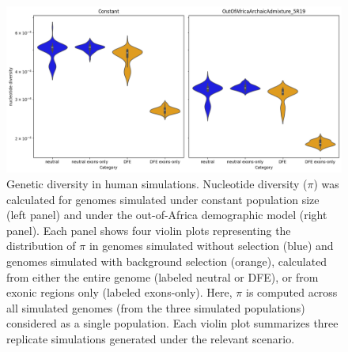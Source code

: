 \documentclass[hidelinks]{article}
\begin{document}
\begin{figure}[h]
    \centering
    \includegraphics[width=\textwidth]{figures/HomSap/summary_stats.png}
    \caption{
    \label{fig:homsap-summary-stats}
    Genetic diversity in human simulations.
    Nucleotide diversity ($\pi$) was calculated for genomes simulated
    under constant population size (left panel) and under the out-of-Africa demographic model (right panel).
    Each panel shows four violin plots representing the distribution of $\pi$
    in genomes simulated without selection (blue) and genomes simulated with background selection (orange),
    calculated from either the entire genome (labeled neutral or DFE),
    or from exonic regions only (labeled exons-only).
    Here, $\pi$ is computed across all simulated genomes (from the three simulated populations)
    considered as a single population.
    Each violin plot summarizes three replicate simulations generated under the relevant scenario. 
    } 
\end{figure}
\end{document}
